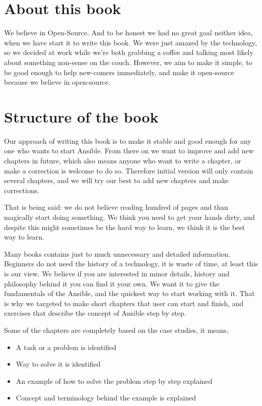 \documentclass[10pt]{book}
\begin{document}
\section*{About this book}
We believe in Open-Source. And to be honest we had no great goal neither idea, when we have start it 
to write this book. We were just amazed by the technology, so we decided at work 
while we're both grabbing a coffee and talking most likely about something 
non-sense on the couch. However, we aim to make it simple, to be good enough to 
help new-comers immediately, and make it open-source because we believe in open-source.


\section*{Structure of the book}
Our approach of writing this book is to make it stable and good enough for any 
one who wants to start Ansible. From there on we want to improve and add new chapters in future, 
which also means anyone who want to write a chapter, or make a correction is welcome to do 
so. Therefore initial version will only contain several chapters, and we will 
try our best to add new chapters and make corrections.

That is being said: we do not believe reading hundred of pages and than magically start doing 
something. We think you need to get your hands dirty, and despite this might sometimes 
be the hard way to learn, we think it is the best way to learn.

Many books contains just to much unnecessary and detailed information. Beginners 
do not need the history of a technology, it is waste of time, at least this is our view. 
We believe if you are interested in minor details, history and philosophy behind 
it you can find it your own.
We want it to give the fundamentals of the Ansible, and the quickest way to 
start working with it. That is why we targeted to make short chapters that user can start and finish, 
and exercises that describe the concept of Ansible step by step.

Some of the chapters are completely based on the case studies, it means, 

\begin{itemize}
\item A task or a problem is identified 
\item Way to solve it is identified
\item An example of how to solve the problem step by step explained
\item Concept and terminology behind the example is explained
\end{itemize}
\end{document}
